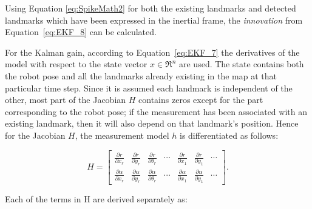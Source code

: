 Using Equation \ref{eq:SpikeMath2} for both the existing landmarks and detected landmarks which have been expressed in the inertial frame, the \textit{innovation} from  Equation~\ref{eq:EKF_8} can be calculated. 

%
%


For the Kalman gain, according to Equation~\ref{eq:EKF_7} the derivatives of the model with respect to the state vector $ x \in \Re^n $ are used. The state contains both the robot pose and all the landmarks already existing in the map at that particular time step. Since it is assumed each landmark is independent of the other, most part of the Jacobian $ H $ contains zeros except for the part corresponding to the robot pose; if the measurement has been associated with an existing landmark, then it will also depend on that landmark's position. Hence for the Jacobian $ H $, the measurement model $ h $ is differentiated as follows:

\begin{equation}
\label{eq:SpikeMath3}
	H = 
	\begin{bmatrix}
	\frac{\partial r}{\partial x_r} & \frac{\partial r}{\partial y_r} & \frac{\partial r}{\partial \theta_r} & \cdots & \frac{\partial r}{\partial x_1} & \frac{\partial r}{\partial y_1} & \cdots \\
	\frac{\partial \alpha}{\partial x_r} & \frac{\partial \alpha}{\partial y_r} & \frac{\partial \alpha}{\partial \theta_r} & \cdots & \frac{\partial \alpha}{\partial x_1} & \frac{\partial \alpha}{\partial y_1} & \cdots 
	\end{bmatrix}.
\end{equation}

Each of the terms in H are derived separately as:


